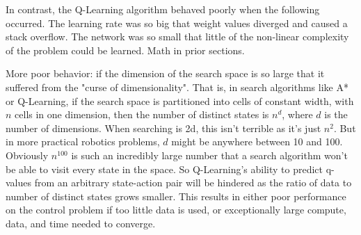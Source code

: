 \documentclass[11pt]{article}
\begin{document}
In contrast, the Q-Learning algorithm behaved poorly when the following occurred. The learning rate was so big that weight values diverged and caused a stack overflow. The network was so small that little of the non-linear complexity of the problem could be learned. Math in prior sections.

More poor behavior: if the dimension of the search space is so large that it suffered from the "curse of dimensionality". That is, in search algorithms like A* or Q-Learning, if the search space is partitioned into cells of constant width, with $n$ cells in one dimension, then the number of distinct states is $n^d$, where $d$ is the number of dimensions. When searching is 2d, this isn't terrible as it's just $n^2$. But in more practical robotics problems, $d$ might be anywhere between 10 and 100. Obviously $n^{100}$ is such an incredibly large number that a search algorithm won't be able to visit every state in the space. So Q-Learning's ability to predict q-values from an arbitrary state-action pair will be hindered as the ratio of data to number of distinct states grows smaller. This results in either poor performance on the control problem if too little data is used, or exceptionally large compute, data, and time needed to converge.



\end{document}
